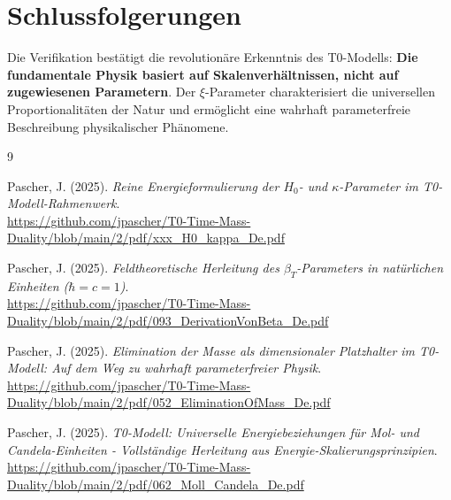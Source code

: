 	\section{Schlussfolgerungen}
	
	Die Verifikation bestätigt die revolutionäre Erkenntnis des T0-Modells: \textbf{Die fundamentale Physik basiert auf Skalenverhältnissen, nicht auf zugewiesenen Parametern}. Der $\xi$-Parameter charakterisiert die universellen Proportionalitäten der Natur und ermöglicht eine wahrhaft parameterfreie Beschreibung physikalischer Phänomene.
	
	\begin{thebibliography}{9}
		
		Pascher, J. (2025). \textit{Reine Energieformulierung der $H_0$- und $\kappa$-Parameter im T0-Modell-Rahmenwerk}. \\
		\url{https://github.com/jpascher/T0-Time-Mass-Duality/blob/main/2/pdf/xxx_H0_kappa_De.pdf}
		
		Pascher, J. (2025). \textit{Feldtheoretische Herleitung des $\beta_T$-Parameters in natürlichen Einheiten ($\hbar = c = 1$)}. \\
		\url{https://github.com/jpascher/T0-Time-Mass-Duality/blob/main/2/pdf/093_DerivationVonBeta_De.pdf}
		
		Pascher, J. (2025). \textit{Elimination der Masse als dimensionaler Platzhalter im T0-Modell: Auf dem Weg zu wahrhaft parameterfreier Physik}. \\
		\url{https://github.com/jpascher/T0-Time-Mass-Duality/blob/main/2/pdf/052_EliminationOfMass_De.pdf}
		
		Pascher, J. (2025). \textit{T0-Modell: Universelle Energiebeziehungen für Mol- und Candela-Einheiten - Vollständige Herleitung aus Energie-Skalierungsprinzipien}. \\
		\url{https://github.com/jpascher/T0-Time-Mass-Duality/blob/main/2/pdf/062_Moll_Candela_De.pdf}
		
	\end{thebibliography}
